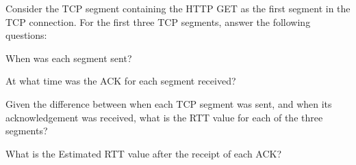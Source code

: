 \documentclass[../main.tex]{subfiles}
\begin{document}
\begin{wts}
	Consider the TCP segment containing the HTTP GET as the first segment in the TCP connection. For the first three TCP segments, answer the following questions:
	\begin{enumalpha}
		\item When was each segment sent?
		\item At what time was the ACK for each segment received?
		\item Given the difference between when each TCP segment was sent, and when its acknowledgement was received, what is the RTT value for each of the three segments?
		\item What is the Estimated RTT value after the receipt of each ACK?
	\end{enumalpha}
\end{wts}
\end{document}
